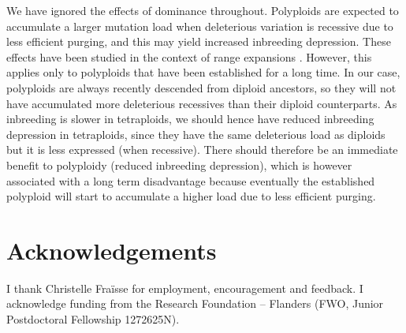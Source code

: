 \documentclass[12pt,a4paper]{article}
\begin{document}
We have ignored the effects of dominance throughout. Polyploids are expected to
accumulate a larger mutation load when deleterious variation is recessive due
to less efficient purging, and this may yield increased inbreeding depression.
These effects have been studied in the context of range expansions
\citep{booker2024}.
However, this applies only to polyploids that have been established for a long
time.
In our case, polyploids are always recently descended from diploid ancestors,
so they will not have accumulated more deleterious recessives than their
diploid counterparts.
As inbreeding is slower in tetraploids, we should hence have reduced inbreeding
depression in tetraploids, since they have the same deleterious load as
diploids but it is less expressed (when recessive).  
There should therefore be an immediate benefit to polyploidy (reduced
inbreeding depression), which is however associated with a long term
disadvantage because eventually the established polyploid will start to
accumulate a higher load due to less efficient purging.

\citep{novikova2023}

\section*{Acknowledgements}

I thank Christelle Fraïsse for employment, encouragement and feedback. I
acknowledge funding from the Research Foundation -- Flanders (FWO, Junior
Postdoctoral Fellowship 1272625N).



\end{document}
